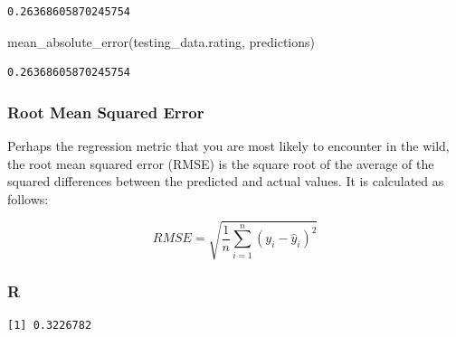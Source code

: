 \documentclass[
  letterpaper,
]{krantz}
\newenvironment{Shaded}{}{}
\newcommand{\DecValTok}[1]{\textcolor[rgb]{0.25,0.63,0.44}{#1}}
\newcommand{\FunctionTok}[1]{\textcolor[rgb]{0.02,0.16,0.49}{#1}}
\newcommand{\NormalTok}[1]{#1}
\newcommand{\SpecialCharTok}[1]{\textcolor[rgb]{0.25,0.44,0.63}{#1}}
\begin{document}
\begin{verbatim}
0.26368605870245754
\end{verbatim}

\begin{Shaded}
\begin{Highlighting}[]
\NormalTok{mean\_absolute\_error(testing\_data.rating, predictions)}
\end{Highlighting}
\end{Shaded}

\begin{verbatim}
0.26368605870245754
\end{verbatim}

\subsubsection{Root Mean Squared Error}\label{root-mean-squared-error}

Perhaps the regression metric that you are most likely to encounter in
the wild, the root mean squared error (RMSE) is the square root of the
average of the squared differences between the predicted and actual
values. It is calculated as follows:

\[RMSE = \sqrt{\frac{1}{n}\sum_{i=1}^{n}(y_i - \hat{y}_i)^2}\]

\subsubsection{R}

\begin{Shaded}
\end{Shaded}

\begin{verbatim}
[1] 0.3226782
\end{verbatim}

\begin{Shaded}
\end{Shaded}
\end{document}
